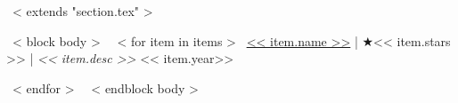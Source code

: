 ~< extends "section.tex" >~

~< block body >~
  ~< for item in items >~
    \href{<< item.repo_url >>}{<< item.name >>} | $\bigstar$<< item.stars >> |
    \emph{<< item.desc >>} \hfill
    << item.year>> \par
  ~< endfor >~
~< endblock body >~
